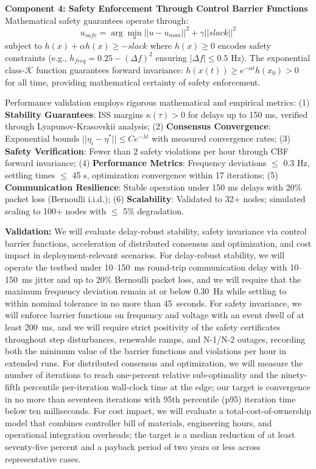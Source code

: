 \documentclass[12pt]{article}
\begin{document}
\textbf{Component 4: Safety Enforcement Through Control Barrier Functions}
Mathematical safety guarantees operate through:
$$u_{safe} = \arg\min_u ||u - u_{nom}||^2 + \gamma||slack||^2$$
subject to $\dot{h}(x) + \alpha h(x) \geq -slack$
where $h(x) \geq 0$ encodes safety constraints (e.g., $h_{freq} = 0.25 - (\Delta f)^2$ ensuring $|\Delta f| \leq 0.5$ Hz). The exponential class-$\mathcal{K}$ function guarantees forward invariance: $h(x(t)) \geq e^{-\alpha t}h(x_0) > 0$ for all time, providing mathematical certainty of safety enforcement.

Performance validation employs rigorous mathematical and empirical metrics: (1) \textbf{Stability Guarantees}: ISS margins $\kappa(\tau) > 0$ for delays up to 150 ms, verified through Lyapunov-Krasovskii analysis; (2) \textbf{Consensus Convergence}: Exponential bounds $||\eta_i - \eta^*|| \leq Ce^{-\lambda t}$ with measured convergence rates; (3) \textbf{Safety Verification}: Fewer than 2 safety violations per hour through CBF forward invariance; (4) \textbf{Performance Metrics}: Frequency deviations $\leq$ 0.3 Hz, settling times $\leq$ 45 s, optimization convergence within 17 iterations; (5) \textbf{Communication Resilience}: Stable operation under 150 ms delays with 20\% packet loss (Bernoulli i.i.d.); (6) \textbf{Scalability}: Validated to 32+ nodes; simulated scaling to 100+ nodes with $\leq$ 5\% degradation.

\textbf{Validation:} We will evaluate delay-robust stability, safety invariance via control barrier functions, acceleration of distributed consensus and optimization, and cost impact in deployment-relevant scenarios. For delay-robust stability, we will operate the testbed under 10--150~ms round-trip communication delay with 10--150~ms jitter and up to 20\% Bernoulli packet loss, and we will require that the maximum frequency deviation remain at or below 0.30~Hz while settling to within nominal tolerance in no more than 45~seconds. For safety invariance, we will enforce barrier functions on frequency and voltage with an event dwell of at least 200~ms, and we will require strict positivity of the safety certificates throughout step disturbances, renewable ramps, and N-1/N-2 outages, recording both the minimum value of the barrier functions and violations per hour in extended runs. For distributed consensus and optimization, we will measure the number of iterations to reach one-percent relative sub-optimality and the ninety-fifth percentile per-iteration wall-clock time at the edge; our target is convergence in no more than seventeen iterations with 95th percentile (p95) iteration time below ten milliseconds. For cost impact, we will evaluate a total-cost-of-ownership model that combines controller bill of materials, engineering hours, and operational integration overheads; the target is a median reduction of at least seventy-five percent and a payback period of two years or less across representative cases.
\end{document}
